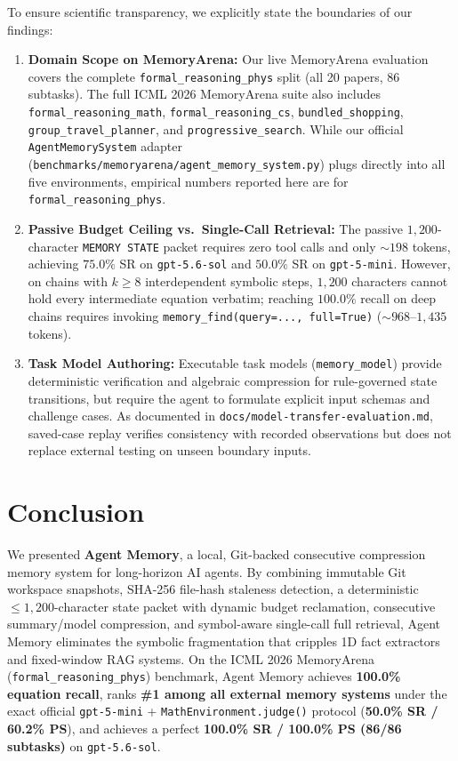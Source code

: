 \documentclass[11pt,a4paper]{article}
\begin{document}
To ensure scientific transparency, we explicitly state the boundaries of our findings:
\begin{enumerate}[leftmargin=1.5em,itemsep=2pt]
    \item \textbf{Domain Scope on MemoryArena:} Our live MemoryArena evaluation covers the complete \texttt{formal\_reasoning\_phys} split (all 20 papers, 86 subtasks). The full ICML 2026 MemoryArena suite also includes \texttt{formal\_reasoning\_math}, \texttt{formal\_reasoning\_cs}, \texttt{bundled\_shopping}, \texttt{group\_travel\_planner}, and \texttt{progressive\_search}. While our official \texttt{AgentMemorySystem} adapter (\texttt{benchmarks/memoryarena/agent\_memory\_system.py}) plugs directly into all five environments, empirical numbers reported here are for \texttt{formal\_reasoning\_phys}.
    \item \textbf{Passive Budget Ceiling vs.\ Single-Call Retrieval:} The passive $1{,}200$-character \texttt{MEMORY STATE} packet requires zero tool calls and only $\sim 198$ tokens, achieving $75.0\%$ SR on \texttt{gpt-5.6-sol} and $50.0\%$ SR on \texttt{gpt-5-mini}. However, on chains with $k \ge 8$ interdependent symbolic steps, $1{,}200$ characters cannot hold every intermediate equation verbatim; reaching $100.0\%$ recall on deep chains requires invoking \texttt{memory\_find(query=..., full=True)} ($\sim 968$--$1{,}435$ tokens).
    \item \textbf{Task Model Authoring:} Executable task models (\texttt{memory\_model}) provide deterministic verification and algebraic compression for rule-governed state transitions, but require the agent to formulate explicit input schemas and challenge cases. As documented in \texttt{docs/model-transfer-evaluation.md}, saved-case replay verifies consistency with recorded observations but does not replace external testing on unseen boundary inputs.
\end{enumerate}

\section{Conclusion}

We presented \textbf{Agent Memory}, a local, Git-backed consecutive compression memory system for long-horizon AI agents. By combining immutable Git workspace snapshots, SHA-256 file-hash staleness detection, a deterministic $\le 1{,}200$-character state packet with dynamic budget reclamation, consecutive summary/model compression, and symbol-aware single-call full retrieval, Agent Memory eliminates the symbolic fragmentation that cripples 1D fact extractors and fixed-window RAG systems. On the ICML 2026 MemoryArena (\texttt{formal\_reasoning\_phys}) benchmark, Agent Memory achieves \textbf{100.0\% equation recall}, ranks \textbf{\#1 among all external memory systems} under the exact official \texttt{gpt-5-mini} + \texttt{MathEnvironment.judge()} protocol (\textbf{50.0\% SR / 60.2\% PS}), and achieves a perfect \textbf{100.0\% SR / 100.0\% PS (86/86 subtasks)} on \texttt{gpt-5.6-sol}.
\end{document}
